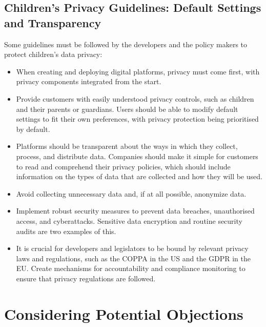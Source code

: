 \documentclass[a4paper, 10 pt, conference]{ieeeconf}  %
\begin{document}
\subsection{Children’s Privacy Guidelines: Default Settings and Transparency}
Some guidelines must be followed by the developers and the policy makers to protect children’s data privacy:
\begin{itemize}
    \item When creating and deploying digital platforms, privacy must come first, with privacy components integrated from the start.
    \item Provide customers with easily understood privacy controls, such as children and their parents or guardians. Users should be able to modify default settings to fit their own preferences, with privacy protection being prioritised by default. 
    \item Platforms should be transparent about the ways in which they collect, process, and distribute data. Companies should make it simple for customers to read and comprehend their privacy policies, which should include information on the types of data that are collected and how they will be used. 
    \item Avoid collecting unnecessary data and, if at all possible, anonymize data. 
    \item Implement robust security measures to prevent data breaches, unauthorised access, and cyberattacks. Sensitive data encryption and routine security audits are two examples of this. 
    \item It is crucial for developers and legislators to be bound by relevant privacy laws and regulations, such as the COPPA in the US and the GDPR in the EU. Create mechanisms for accountability and compliance monitoring to ensure that privacy regulations are followed. 
\end{itemize}
\section{Considering Potential Objections}
\end{document}
